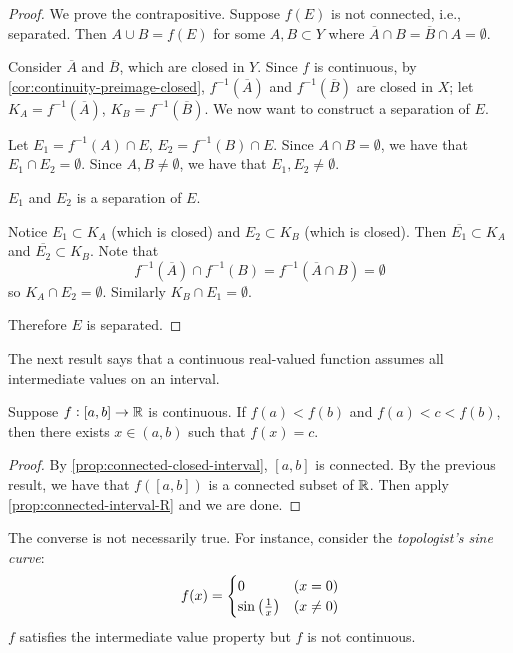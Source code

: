 \begin{proof}
We prove the contrapositive. Suppose $f(E)$ is not connected, i.e., separated. Then $A\cup B=f(E)$ for some $A,B\subset Y$ where $\overline{A}\cap B=\overline{B}\cap A=\emptyset$.

Consider $\overline{A}$ and $\overline{B}$, which are closed in $Y$. Since $f$ is continuous, by \cref{cor:continuity-preimage-closed}, $f^{-1}(\overline{A})$ and $f^{-1}(\overline{B})$ are closed in $X$; let $K_A=f^{-1}(\overline{A})$, $K_B=f^{-1}(\overline{B})$. We now want to construct a separation of $E$.

Let $E_1=f^{-1}(A)\cap E$, $E_2=f^{-1}(B)\cap E$. Since $A\cap B=\emptyset$, we have that $E_1\cap E_2=\emptyset$. Since $A,B\neq\emptyset$, we have that $E_1,E_2\neq\emptyset$. 
\begin{claim}
$E_1$ and $E_2$ is a separation of $E$.
\end{claim}
Notice $E_1\subset K_A$ (which is closed) and $E_2\subset K_B$ (which is closed). Then $\overline{E_1}\subset K_A$ and $\overline{E_2}\subset K_B$. Note that
\[f^{-1}(\overline{A})\cap f^{-1}(B)=f^{-1}(\overline{A}\cap B)=\emptyset\]
so $K_A\cap E_2=\emptyset$. Similarly $K_B\cap E_1=\emptyset$.

Therefore $E$ is separated.
\end{proof}

The next result says that a continuous real-valued function assumes all intermediate values on an interval. 

\begin{theorem}
Suppose $f:[a,b]\to\mathbb R$ is continuous. If $f(a)<f(b)$ and $f(a)<c<f(b)$, then there exists $x\in(a,b)$ such that $f(x)=c$.
\end{theorem}

\begin{proof}
By \cref{prop:connected-closed-interval}, $[a,b]$ is connected. By the previous result, we have that $f([a,b])$ is a connected subset of $\mathbb R$. Then apply \cref{prop:connected-interval-R} and we are done.
\end{proof}

\begin{remark}
The converse is not necessarily true. For instance, consider the \emph{topologist's sine curve}:
\[f(x)=\begin{cases}
0&(x=0)\\
\sin\left(\frac{1}{x}\right)&(x\neq0)
\end{cases}\]
$f$ satisfies the intermediate value property but $f$ is not continuous.
\end{remark}
\pagebreak

